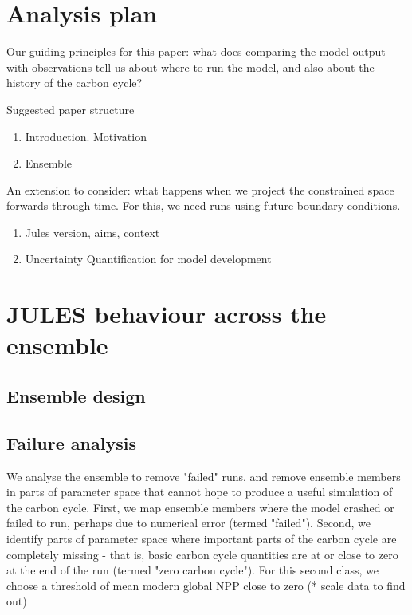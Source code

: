 \documentclass[gmd, manuscript]{copernicus}
\begin{document}

\section{Analysis plan}

Our guiding principles for this paper: what does comparing the model output with observations tell us about where to run the model, and also about the history of the carbon cycle?

Suggested paper structure
\begin{enumerate}
    \item Introduction. Motivation
    \item Ensemble
\end{enumerate}

An extension to consider: what happens when we project the constrained space forwards through time. For this, we need runs using future boundary conditions.


\introduction  %

\begin{enumerate}
    \item Jules version, aims, context 
    \item Uncertainty Quantification for model development
\end{enumerate}



\section{JULES behaviour across the ensemble}

\subsection{Ensemble design}

\subsection{Failure analysis}

We analyse the ensemble to remove "failed" runs, and remove ensemble members in parts of parameter space that cannot hope to produce a useful simulation of the carbon cycle. First, we map ensemble members where the model crashed or failed to run, perhaps due to numerical error (termed "failed"). Second, we identify parts of parameter space where important parts of the carbon cycle are completely missing - that is, basic carbon cycle quantities are at or close to zero at the end of the run (termed "zero carbon cycle"). For this second class, we choose a threshold of mean modern global NPP close to zero (* scale data to find out)
\end{document}
